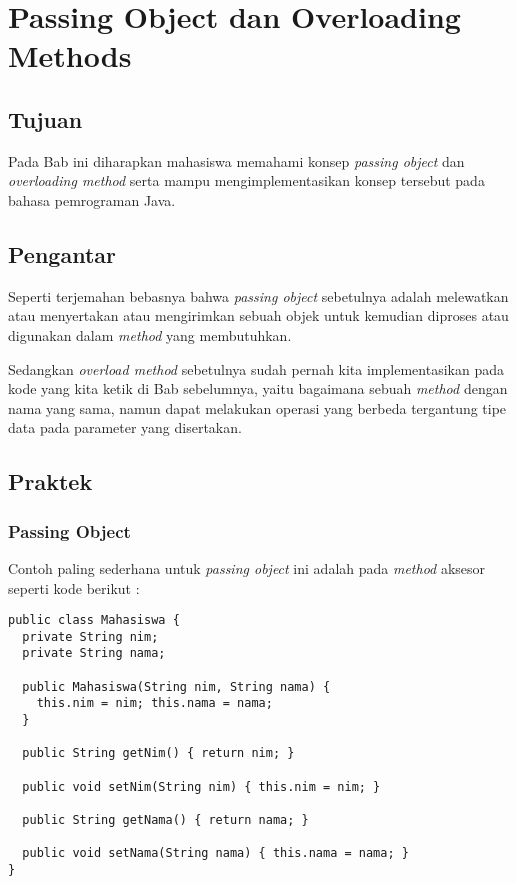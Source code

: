 \chapter{Passing Object dan Overloading Methods}

\section{Tujuan}

Pada Bab ini diharapkan mahasiswa memahami konsep \textit{passing object} dan \textit{overloading method} serta mampu mengimplementasikan konsep tersebut pada bahasa pemrograman Java.

\section{Pengantar}

Seperti terjemahan bebasnya bahwa \textit{passing object} sebetulnya adalah melewatkan atau menyertakan atau mengirimkan sebuah objek untuk kemudian diproses atau digunakan dalam \textit{method} yang membutuhkan.

Sedangkan \textit{overload method} sebetulnya sudah pernah kita implementasikan pada kode yang kita ketik di Bab sebelumnya, yaitu bagaimana sebuah \textit{method} dengan nama yang sama, namun dapat melakukan operasi yang berbeda tergantung tipe data pada parameter yang disertakan.

\section{Praktek}

\subsection{Passing Object}

Contoh paling sederhana untuk \textit{passing object} ini adalah pada \textit{method} aksesor seperti kode berikut :

\begin{lstlisting}
public class Mahasiswa {
  private String nim;
  private String nama;
  
  public Mahasiswa(String nim, String nama) {
    this.nim = nim; this.nama = nama;
  }
  
  public String getNim() { return nim; }
  
  public void setNim(String nim) { this.nim = nim; }
  
  public String getNama() { return nama; }
  
  public void setNama(String nama) { this.nama = nama; }
}
\end{lstlisting}

